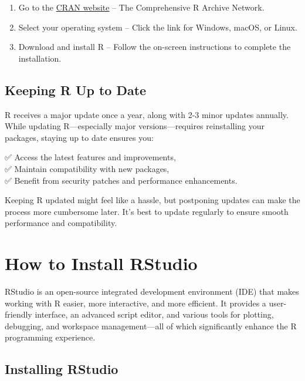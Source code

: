 \documentclass[
]{book}
\providecommand{\tightlist}{%
  \setlength{\itemsep}{0pt}\setlength{\parskip}{0pt}}
\theoremstyle{definition}
\theoremstyle{definition}
\theoremstyle{definition}
\theoremstyle{definition}
\theoremstyle{remark}
\begin{document}
\begin{enumerate}
\def\labelenumi{\arabic{enumi}.}
\tightlist
\item
  Go to the \href{https://cran.r-project.org}{CRAN website} -- The Comprehensive R Archive Network.\\
\item
  Select your operating system -- Click the link for Windows, macOS, or Linux.\\
\item
  Download and install R -- Follow the on-screen instructions to complete the installation.
\end{enumerate}

\subsection*{Keeping R Up to Date}\label{keeping-r-up-to-date}

R receives a major update once a year, along with 2-3 minor updates annually. While updating R---especially major versions---requires reinstalling your packages, staying up to date ensures you:

✅ Access the latest features and improvements,\\
✅ Maintain compatibility with new packages,\\
✅ Benefit from security patches and performance enhancements.

Keeping R updated might feel like a hassle, but postponing updates can make the process more cumbersome later. It's best to update regularly to ensure smooth performance and compatibility.

\section{How to Install RStudio}\label{how-to-install-rstudio}

RStudio is an open-source integrated development environment (IDE) that makes working with R easier, more interactive, and more efficient. It provides a user-friendly interface, an advanced script editor, and various tools for plotting, debugging, and workspace management---all of which significantly enhance the R programming experience.

\subsection*{Installing RStudio}\label{installing-rstudio}
\end{document}
